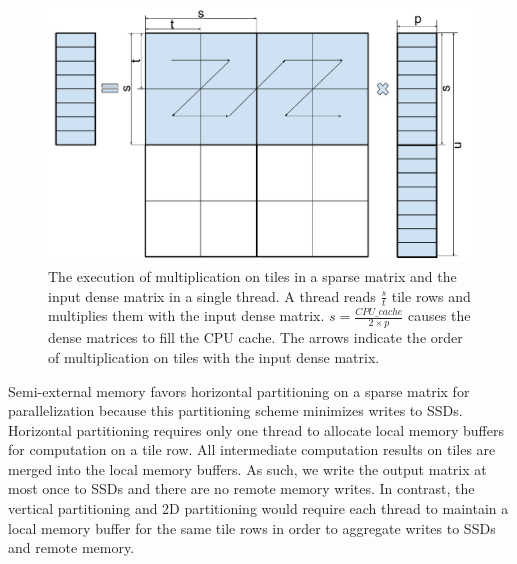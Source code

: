 \begin{figure}
\centering
\includegraphics[scale=0.3]{SpMM_figs/SpMM_exec.pdf}
\caption{The execution of multiplication on tiles in a sparse matrix and
	the input dense matrix in a single thread. A thread reads $\frac{s}{t}$
	tile rows and multiplies them with the input dense matrix.
	$s = \frac{CPU\_cache}{2 \times p}$ causes the dense matrices to fill
	the CPU cache. The arrows indicate the order of multiplication on tiles with the input dense matrix.}
\label{spmm_exec}
\end{figure}

Semi-external memory favors horizontal partitioning on a sparse matrix
for parallelization because this partitioning scheme minimizes writes to SSDs.
Horizontal partitioning
requires only one thread to allocate local memory buffers for computation on
a tile row. All intermediate computation results on tiles are merged into
the local memory buffers. As such, we write the output matrix at most once
to SSDs and there are no remote memory writes.
In contrast, the vertical partitioning and 2D partitioning \cite{Koanantakool16}
would require each thread to maintain a local memory buffer for the same tile rows in order
to aggregate writes to SSDs and remote memory.

